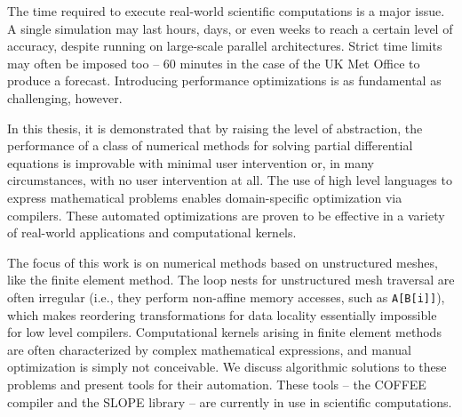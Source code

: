 The time required to execute real-world scientific computations is a major issue. A single simulation may last hours, days, or even weeks to reach a certain level of accuracy, despite running on large-scale parallel architectures. Strict time limits may often be imposed too -- 60 minutes in the case of the UK Met Office to produce a forecast. Introducing performance optimizations is as fundamental as challenging, however. 

In this thesis, it is demonstrated that by raising the level of abstraction, the performance of a class of numerical methods for solving partial differential equations is improvable with minimal user intervention or, in many circumstances, with no user intervention at all. The use of high level languages to express mathematical problems enables domain-specific optimization via compilers. These automated optimizations are proven to be effective in a variety of real-world applications and computational kernels.

The focus of this work is on numerical methods based on unstructured meshes, like the finite element method. The loop nests for unstructured mesh traversal are often irregular (i.e., they perform non-affine memory accesses, such as {\tt A[B[i]]}), which makes reordering transformations for data locality essentially impossible for low level compilers. Computational kernels arising in finite element methods are often characterized by complex mathematical expressions, and manual optimization is simply not conceivable. We discuss algorithmic solutions to these problems and present tools for their automation. These tools -- the COFFEE compiler and the SLOPE library -- are currently in use in scientific computations.


